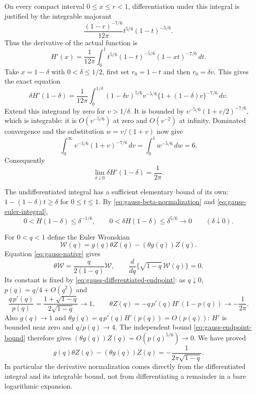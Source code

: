 \documentclass[11pt,a4paper]{article}
\begin{document}
On every compact interval $0\leq x\leq r<1$, differentiation under
this integral is justified by the integrable majorant
\[
 \frac{(1-r)^{-7/6}}{12\pi}
                       t^{5/6}(1-t)^{-5/6}.
\]
Thus the derivative of the actual function is
\begin{equation}\label{eq:gauss-differentiated-euler}
 H'(x)=\frac1{12\pi}\int_0^1
       t^{5/6}(1-t)^{-5/6}(1-xt)^{-7/6}\,dt.
\end{equation}
Take $x=1-\delta$ with $0<\delta\leq1/2$, first set $r_0=1-t$
and then $r_0=\delta v$.  This gives the exact equation
\begin{equation}\label{eq:gauss-scaled-derivative-integral}
 \delta H'(1-\delta)=\frac1{12\pi}\int_0^{1/\delta}
    (1-\delta v)^{5/6}v^{-5/6}
                  \{1+(1-\delta)v\}^{-7/6}\,dv.
\end{equation}
Extend this integrand by zero for $v>1/\delta$.  It is bounded by
$v^{-5/6}(1+v/2)^{-7/6}$, which is integrable: it is $O(v^{-5/6})$
at zero and $O(v^{-2})$ at infinity.  Dominated convergence and the
substitution $w=v/(1+v)$ now give
\[
 \int_0^\infty v^{-5/6}(1+v)^{-7/6}\,dv
                      =\int_0^1w^{-5/6}\,dw=6.
\]
Consequently
\begin{equation}\label{eq:gauss-differentiated-endpoint}
                       \lim_{\delta\downarrow0}
                       \delta H'(1-\delta)=\frac1{2\pi}.
\end{equation}

The undifferentiated integral has a sufficient elementary bound of its
own: $1-(1-\delta)t\geq\delta$ for $0\leq t\leq1$.  By
\eqref{eq:gauss-beta-normalization} and
\eqref{eq:gauss-euler-integral},
\begin{equation}\label{eq:gauss-endpoint-bound}
 0<H(1-\delta)\leq\delta^{-1/6},\qquad
 0<\delta H(1-\delta)\leq\delta^{5/6}\longrightarrow0
 \qquad(\delta\downarrow0).
\end{equation}

For $0<q<1$ define the Euler Wronskian
\[
                \mathcal W(q)=g(q)\theta Z(q)-(\theta g(q))Z(q).
\]
Equation \eqref{eq:gauss-native} gives
\[
 \theta\mathcal W=\frac{q}{2(1-q)}\mathcal W,
 \qquad \frac{d}{dq}\{\sqrt{1-q}\,\mathcal W(q)\}=0.
\]
Its constant is fixed by \eqref{eq:gauss-differentiated-endpoint}:
as $q\downarrow0$, $p(q)=q/4+O(q^2)$ and
\[
 \frac{q\,p'(q)}{p(q)}=\frac{1+\sqrt{1-q}}{2\sqrt{1-q}}\longrightarrow1,
 \qquad
 \theta Z(q)=-q\,p'(q)H'(1-p(q))\longrightarrow-\frac1{2\pi}.
\]
Also $g(q)\to1$ and $\theta g(q)=q\,p'(q)H'(p(q))=O(p(q))$:
$H'$ is bounded near zero and $q/p(q)\to4$.
The independent bound \eqref{eq:gauss-endpoint-bound} therefore gives
$(\theta g(q))Z(q)=O(p(q)^{5/6})\to0$.
We have proved
\begin{equation}\label{eq:gauss-normalized-wronskian}
 g(q)\theta Z(q)-(\theta g(q))Z(q)
                         =-\frac1{2\pi\sqrt{1-q}}.
\end{equation}
In particular the derivative normalization comes directly from the
differentiated integral and its integrable bound, not from
differentiating a remainder in a bare logarithmic expansion.
\end{document}
